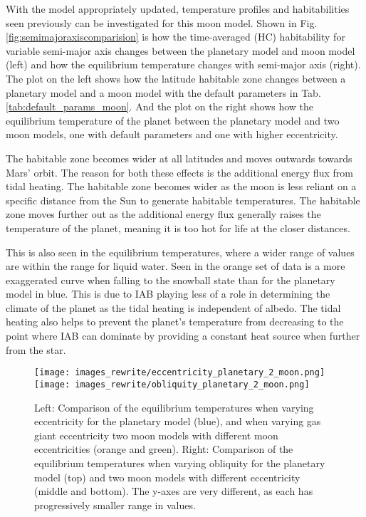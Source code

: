 \documentclass[12pt, onecolumn]{revtex4-2}    %
\begin{document}
With the model appropriately updated, temperature profiles and habitabilities seen previously can be investigated for this moon model.
Shown in Fig. \ref{fig:semimajoraxiscomparision} is how the time-averaged (HC) habitability for variable semi-major axis changes between the planetary model and moon model (left) and how the equilibrium temperature changes with semi-major axis (right). 
The plot on the left shows how the latitude habitable zone changes between a planetary model and a moon model with the default parameters in Tab. \ref{tab:default_params_moon}.
And the plot on the right shows how the equilibrium temperature of the planet between the planetary model and two moon models, one with default parameters and one with higher eccentricity.

The habitable zone becomes wider at all latitudes and moves outwards towards Mars' orbit.
The reason for both these effects is the additional energy flux from tidal heating.
The habitable zone becomes wider as the moon is less reliant on a specific distance from the Sun to generate habitable temperatures.
The habitable zone moves further out as the additional energy flux generally raises the temperature of the planet, meaning it is too hot for life at the closer distances.

This is also seen in the equilibrium temperatures, where a wider range of values are within the range for liquid water. 
Seen in the orange set of data is a more exaggerated curve when falling to the snowball state than for the planetary model in blue.
This is due to IAB playing less of a role in determining the climate of the planet as the tidal heating is independent of albedo.
The tidal heating also helps to prevent the planet's temperature from decreasing to the point where IAB can dominate by providing a constant heat source when further from the star.

\begin{figure}[t]
  \texttt{[image: images\_rewrite/eccentricity\_planetary\_2\_moon.png]}
  \texttt{[image: images\_rewrite/obliquity\_planetary\_2\_moon.png]}
  \caption{
    Left: Comparison of the equilibrium temperatures when varying eccentricity for the planetary model (blue), and when varying gas giant eccentricity two moon models with different moon eccentricities (orange and green).
    Right: Comparison of the equilibrium temperatures when varying obliquity for the planetary model (top) and two moon models with different eccentricity (middle and bottom).
    The y-axes are very different, as each has progressively smaller range in values.
  }
  \label{fig:eccentricity_obliquity_comparisions}
\end{figure}
\end{document}
